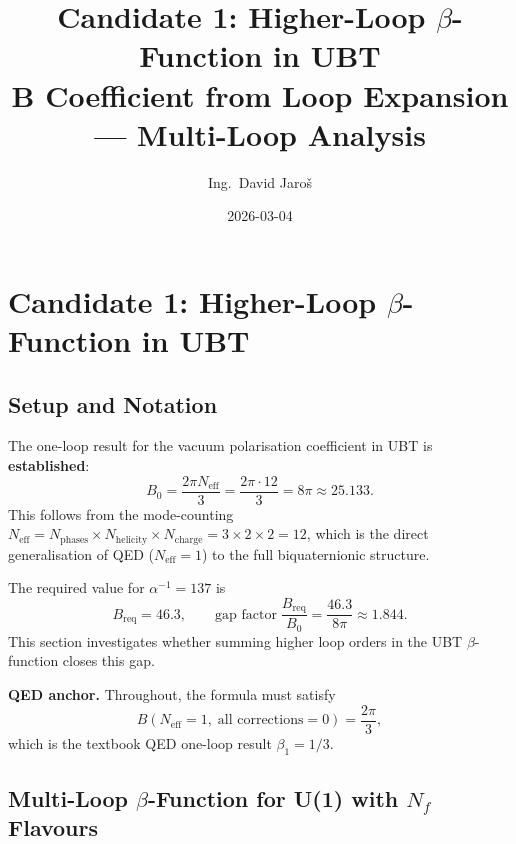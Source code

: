 \documentclass[11pt,a4paper]{article}
\title{Candidate 1: Higher-Loop $\beta$-Function in UBT\\
    \large B Coefficient from Loop Expansion — Multi-Loop Analysis}
\author{Ing.\ David Jaroš}
\date{2026-03-04}
\theoremstyle{remark}
\begin{document}
  \maketitle
\fi

\section{Candidate 1: Higher-Loop \texorpdfstring{$\beta$}{beta}-Function in UBT}
\label{sec:candidate1_multiloop}

\subsection{Setup and Notation}

The one-loop result for the vacuum polarisation coefficient in UBT is \textbf{established}:
\begin{equation}
  B_0 = \frac{2\pi N_{\mathrm{eff}}}{3} = \frac{2\pi \cdot 12}{3} = 8\pi \approx 25.133.
  \label{eq:B0_proved}
\end{equation}
This follows from the mode-counting $N_{\mathrm{eff}} = N_{\mathrm{phases}} \times N_{\mathrm{helicity}} \times N_{\mathrm{charge}} = 3\times 2\times 2 = 12$, which is the direct generalisation of QED ($N_{\mathrm{eff}} = 1$) to the full biquaternionic structure.

The required value for $\alpha^{-1} = 137$ is
\begin{equation}
  B_{\mathrm{req}} = 46.3, \qquad \text{gap factor} \; \frac{B_{\mathrm{req}}}{B_0} = \frac{46.3}{8\pi} \approx 1.844.
  \label{eq:gap_factor}
\end{equation}
This section investigates whether summing higher loop orders in the UBT $\beta$-function closes this gap.

\textbf{QED anchor.} Throughout, the formula must satisfy
\begin{equation}
  B(N_{\mathrm{eff}} = 1,\; \text{all corrections} = 0) = \frac{2\pi}{3},
  \label{eq:qed_anchor}
\end{equation}
which is the textbook QED one-loop result $\beta_1 = 1/3$.

\subsection{Multi-Loop \texorpdfstring{$\beta$}{beta}-Function for U(1) with \texorpdfstring{$N_f$}{Nf} Flavours}
\end{document}
